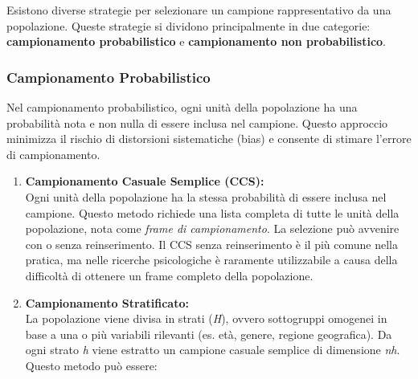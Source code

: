 \documentclass[
  letterpaper,
]{krantz}
\begin{document}
Esistono diverse strategie per selezionare un campione rappresentativo
da una popolazione. Queste strategie si dividono principalmente in due
categorie: \textbf{campionamento probabilistico} e \textbf{campionamento
non probabilistico}.

\subsubsection{Campionamento
Probabilistico}\label{campionamento-probabilistico}

Nel campionamento probabilistico, ogni unità della popolazione ha una
probabilità nota e non nulla di essere inclusa nel campione. Questo
approccio minimizza il rischio di distorsioni sistematiche (bias) e
consente di stimare l'errore di campionamento.

\begin{enumerate}
\def\labelenumi{\arabic{enumi}.}
\item
  \textbf{Campionamento Casuale Semplice (CCS):}\\
  Ogni unità della popolazione ha la stessa probabilità di essere
  inclusa nel campione. Questo metodo richiede una lista completa di
  tutte le unità della popolazione, nota come \emph{frame di
  campionamento}. La selezione può avvenire con o senza reinserimento.
  Il CCS senza reinserimento è il più comune nella pratica, ma nelle
  ricerche psicologiche è raramente utilizzabile a causa della
  difficoltà di ottenere un frame completo della popolazione.
\item
  \textbf{Campionamento Stratificato:}\\
  La popolazione viene divisa in strati (\emph{H}), ovvero sottogruppi
  omogenei in base a una o più variabili rilevanti (es. età, genere,
  regione geografica). Da ogni strato \emph{h} viene estratto un
  campione casuale semplice di dimensione \emph{nh}. Questo metodo può
  essere:


\end{enumerate}
\end{document}
